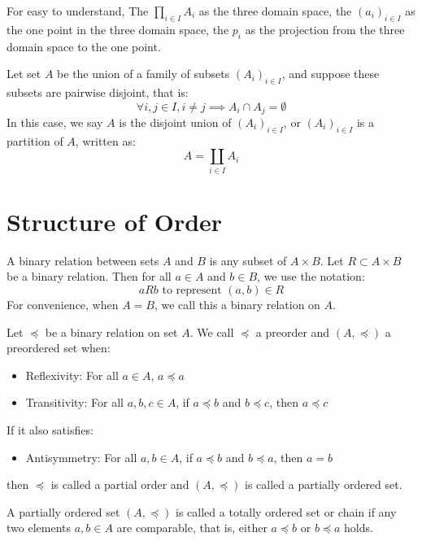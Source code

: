 \begin{remark}
  For easy to understand, The $\prod_{i \in I} A_i$ as the three domain space, the $(a_i)_{i\in I}$ as the one point in the three domain space, the $p_i$ as the projection from the three domain space to the one point.
\end{remark}

\begin{definition}
  Let set $A$ be the union of a family of subsets $(A_i)_{i \in I}$, and suppose these subsets are pairwise disjoint, that is:
  \[
    \forall i,j \in I, i \neq j \implies A_i \cap A_j = \emptyset
  \]
  In this case, we say $A$ is the disjoint union of $(A_i)_{i \in I}$, or $(A_i)_{i \in I}$ is a partition of $A$, written as:
  \[
    A = \coprod_{i \in I} A_i
  \]
\end{definition}

\section{Structure of Order}

\begin{definition}
  A binary relation between sets $A$ and $B$ is any subset of $A \times B$. Let $R \subset A \times B$ be a binary relation. Then for all $a \in A$ and $b \in B$, we use the notation:
  \[
    aRb \text{ to represent } (a,b) \in R
  \]
  For convenience, when $A = B$, we call this a binary relation on $A$.
\end{definition}

\begin{definition}
  Let $\preceq$ be a binary relation on set $A$. We call $\preceq$ a preorder and $(A,\preceq)$ a preordered set when:
  \begin{itemize}
    \item Reflexivity: For all $a \in A$, $a \preceq a$
    \item Transitivity: For all $a,b,c \in A$, if $a \preceq b$ and $b \preceq c$, then $a \preceq c$
  \end{itemize}

  If it also satisfies:
  \begin{itemize}
    \item Antisymmetry: For all $a,b \in A$, if $a \preceq b$ and $b \preceq a$, then $a = b$
  \end{itemize}
  then $\preceq$ is called a partial order and $(A,\preceq)$ is called a partially ordered set.

  A partially ordered set $(A,\preceq)$ is called a totally ordered set or chain if any two elements $a,b \in A$ are comparable, that is, either $a \preceq b$ or $b \preceq a$ holds.
\end{definition}

